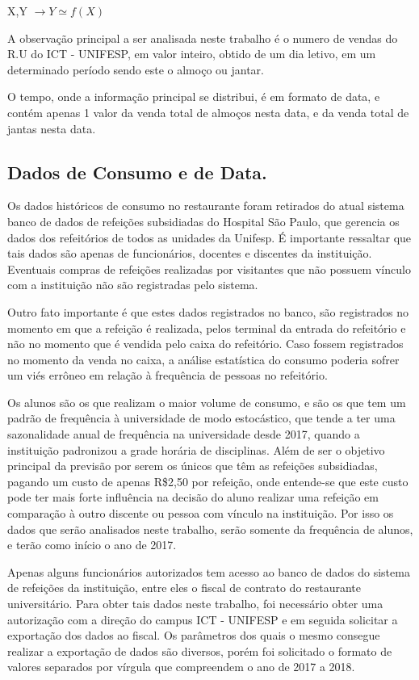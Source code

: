 \documentclass[	12pt, Times, openright, twoside, a4paper, english, brazil]{abntex2}
\begin{document}
X,Y $\rightarrow Y \simeq f(X) $

A observação principal a ser analisada neste trabalho é o numero de vendas do R.U do ICT - UNIFESP, em valor inteiro, obtido de um dia letivo, em um determinado período sendo este o almoço ou jantar.

O tempo, onde a informação principal se distribui, é em formato de data, e contém apenas 1 valor da venda total de almoços nesta data, e da venda total de jantas nesta data.

\subsection{Dados de Consumo e de Data.}
Os dados históricos de consumo no restaurante foram retirados do atual sistema banco de dados de refeições subsidiadas do Hospital São Paulo, que gerencia os dados dos refeitórios de todos as unidades da Unifesp. É importante ressaltar que tais dados são apenas de funcionários, docentes e discentes da instituição. Eventuais compras de refeições realizadas por visitantes que não possuem vínculo com a instituição não são registradas pelo sistema. 

Outro fato importante é que estes dados registrados no banco, são registrados no momento em que a refeição é realizada, pelos terminal da entrada do refeitório e não no momento que é vendida pelo caixa do refeitório. Caso fossem registrados no momento da venda no caixa, a análise estatística do consumo poderia sofrer um viés errôneo em relação à frequência de pessoas no refeitório. 

Os alunos são os que realizam o maior volume de consumo, e são os que tem um padrão de frequência à universidade de modo estocástico, que tende a ter uma sazonalidade anual de frequência na universidade desde 2017, quando a instituição padronizou a grade horária de disciplinas.  Além de ser o objetivo principal da previsão por serem os únicos que têm as refeições subsidiadas, pagando um custo de apenas R\$2,50 por refeição, onde entende-se que este custo pode ter mais forte influência na decisão do aluno realizar uma refeição em comparação à outro discente ou pessoa com vínculo na instituição. Por isso os dados que serão analisados neste trabalho, serão somente da frequência de alunos, e terão como início o ano de 2017. 

Apenas alguns funcionários autorizados tem acesso ao banco de dados do sistema de refeições da instituição, entre eles o fiscal de contrato do restaurante universitário. Para obter tais dados neste trabalho, foi necessário obter uma autorização com a direção do campus ICT - UNIFESP e em seguida solicitar a exportação dos dados ao fiscal. Os parâmetros dos quais o mesmo consegue realizar a exportação de dados são diversos, porém foi solicitado o formato de valores separados por vírgula que compreendem o ano de 2017 a 2018.
\end{document}

